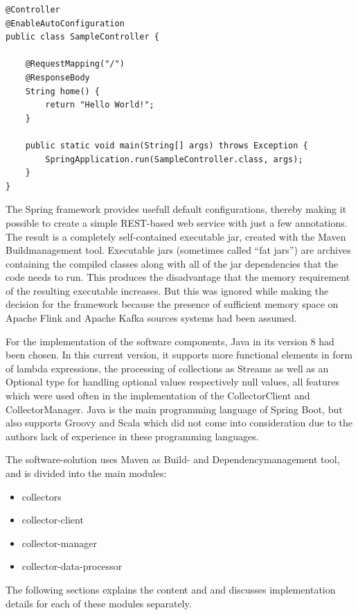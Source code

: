 \begin{lstlisting}[caption={Spring Boot "Hello World"}, captionpos=b, label={lst:spring-boot-hello-world}]
@Controller
@EnableAutoConfiguration
public class SampleController {

    @RequestMapping("/")
    @ResponseBody
    String home() {
        return "Hello World!";
    }

    public static void main(String[] args) throws Exception {
        SpringApplication.run(SampleController.class, args);
    }
}
\end{lstlisting}

The Spring framework provides usefull default configurations, thereby making it possible to create a simple REST-based web service
with just a few annotations. The result is a completely self-contained executable jar, created with the Maven
Buildmanagement tool. Executable jars (sometimes called “fat jars”) are archives containing the compiled classes along with
all of the jar dependencies that the code needs to run. This produces the disadvantage that the memory requirement of the
resulting executable increases. But this was ignored while making the decision for the framework because the presence of
sufficient memory space on Apache Flink and Apache Kafka sources systems had been assumed.

For the implementation of the software components, Java in its version 8 had been chosen. In this current version,
it supports more functional elements in form of lambda expressions, the processing of collections as Streams as well
as an Optional type for handling optional values respectively null values, all features which were used often in the
implementation of the CollectorClient and CollectorManager. Java is the main programming language of Spring Boot, but also
supports Groovy and Scala which did not come into consideration due to the authors lack of experience in these programming
languages.

The software-solution uses Maven as Build- and Dependencymanagement tool, and is divided into the main modules:

\begin{itemize}
	\item collectors
	\item collector-client
	\item collector-manager
	\item collector-data-processor
\end{itemize}

The following sections explains the content and and discusses implementation details for each of these modules separately.

